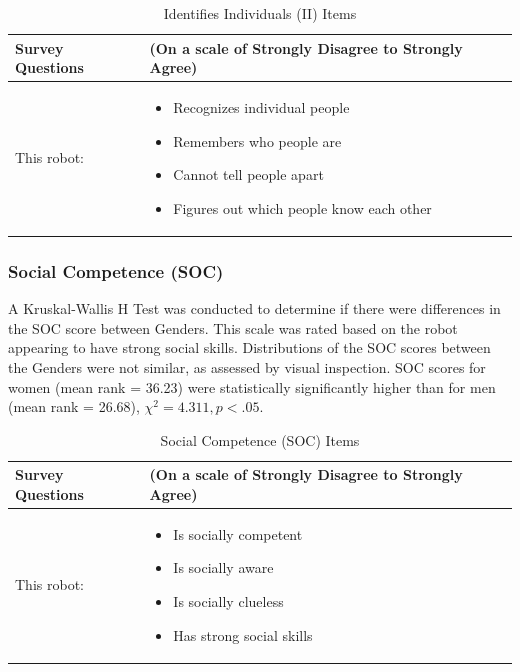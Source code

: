 \documentclass[letterpaper, 10 pt, conference]{ieeeconf}  %
\begin{document}
\begin{table}[H]
\caption{Identifies Individuals (II) Items \label{II}}
\begin{center}
\begin{tabu}{|p{1.5cm} p{6cm}|}
\hline
\textbf{Survey Questions} &(On a scale of Strongly Disagree to Strongly Agree)\\
\hline
This robot: &
\begin{itemize}
\item Recognizes individual people
\item Remembers who people are
\item Cannot tell people apart
\item Figures out which people know each other
\end{itemize}\\
\hline
\end{tabu}
\end{center}
\end{table}

\subsubsection{Social Competence (SOC)}
A Kruskal-Wallis H Test was conducted to determine if there were differences in the SOC score between Genders. This scale was rated based on the robot appearing to have strong social skills. Distributions of the SOC scores between the Genders were not similar, as assessed by visual inspection. SOC scores for women (mean rank = 36.23) were statistically significantly higher than for men (mean rank = 26.68), \begin{math}\chi ^2= 4.311, p < .05 \end{math}.


\begin{table}[h]
\caption{Social Competence (SOC) Items}
\centering
\begin{tabu}{|p{1.5cm} p{6cm}|}
\hline
\textbf{Survey Questions} &(On a scale of Strongly Disagree to Strongly Agree)\\
\hline
This robot: &
\begin{itemize}
\item Is socially competent
\item Is socially aware
\item Is socially clueless
\item Has strong social skills
\end{itemize}\\
\hline
\end{tabu}
\end{table}
\end{document}
